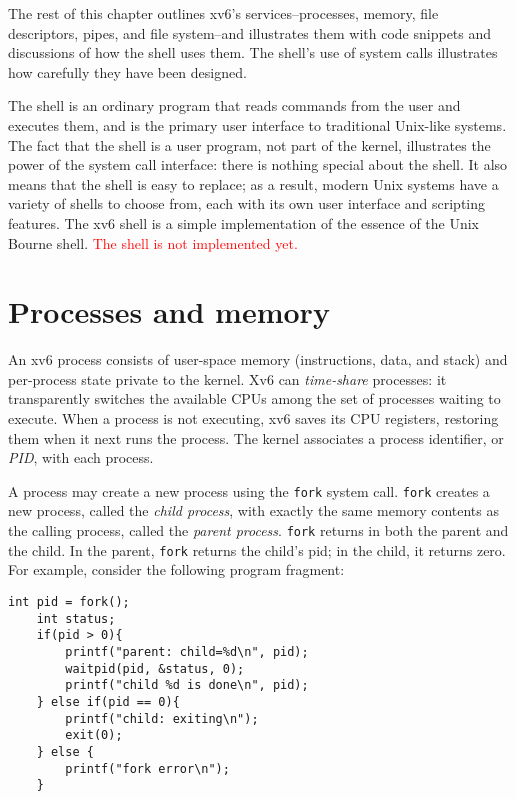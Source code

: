 \documentclass{report}
\begin{document}
	The rest of this chapter outlines xv6's services--processes, memory, file descriptors, 
	pipes, and file system--and illustrates them with code snippets and discussions of
	how the shell uses them. The shell's use of system calls illustrates how carefully they
	have been designed.
	
	The shell is an ordinary program that reads commands from the user and executes them, 
	and is the primary user interface to traditional Unix-like systems. The fact
	that the shell is a user program, not part of the kernel, illustrates the power of the 
	system call interface: there is nothing special about the shell. It also means that the shell
	is easy to replace; as a result, modern Unix systems have a variety of shells to choose
	from, each with its own user interface and scripting features. The xv6 shell is a simple
	implementation of the essence of the Unix Bourne shell.
	\textcolor{red}{
		The shell is not implemented yet.
	}
	
	\section{Processes and memory}
	An xv6 process consists of user-space memory (instructions, data, and stack) and
	per-process state private to the kernel. Xv6 can \emph{time-share} processes: it
	transparently switches the available CPUs among the set of processes waiting to execute. 
	When a process is not executing, xv6 saves its CPU registers, restoring them when it next 
	runs the process. The kernel associates a process identifier, or \emph{PID}, with each process.
	
	A process may create a new process using the \texttt{fork} system call. \texttt{fork} creates a
	new process, called the \emph{child process}, with exactly the same memory contents as the
	calling process, called the \emph{parent process}. \texttt{fork} returns in both the parent and the
	child. In the parent, \texttt{fork} returns the child's pid; in the child, it returns zero. 
	For example, consider the following program fragment:
	
	\begin{lstlisting}[style=c]
	int pid = fork();
	int status;
	if(pid > 0){
		printf("parent: child=%d\n", pid);
		waitpid(pid, &status, 0);
		printf("child %d is done\n", pid);
	} else if(pid == 0){
		printf("child: exiting\n");
		exit(0);
	} else {
		printf("fork error\n");
	}
	\end{lstlisting}
	
\end{document}
